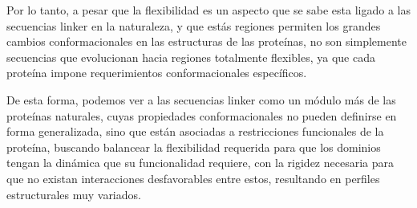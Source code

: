 





Por lo tanto, a pesar que la flexibilidad es un aspecto que se sabe esta ligado a las secuencias linker en la naturaleza\cite{wriggers2005control}, 
y que estás regiones permiten los grandes cambios conformacionales en las estructuras de las proteínas, 
no son simplemente secuencias que evolucionan hacia regiones totalmente flexibles, ya que cada proteína impone requerimientos conformacionales específicos.

De esta forma, podemos ver a las secuencias linker como un módulo más de las proteínas naturales, cuyas propiedades conformacionales no pueden definirse en forma generalizada, sino que están 
asociadas a restricciones funcionales de la proteína, buscando balancear la flexibilidad requerida para que los dominios tengan la dinámica que su funcionalidad requiere, 
con la rigidez necesaria para que no existan interacciones desfavorables entre estos, resultando en perfiles estructurales muy variados.




